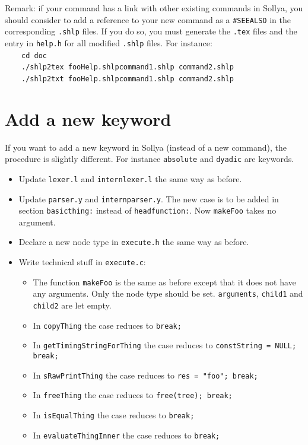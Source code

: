 \documentclass{article}
\newcommand{\commandName}{\texttt{foo}\xspace}
\newcommand{\commandMakeFunc}{\texttt{makeFoo}}
\newcommand{\commandShlpWithoutDoc}{\texttt{fooHelp.shlp}\xspace} %
\begin{document}
Remark: if your command has a link with other existing commands in Sollya, you should consider to add a reference to your new command as a \texttt{\#SEEALSO} in the corresponding \texttt{.shlp} files. If you do so, you must generate the \texttt{.tex} files and the entry in \texttt{help.h} for all modified \texttt{.shlp} files. For instance:\\
\phantom{1}~~~~\texttt{cd doc}\\
\phantom{1}~~~~\texttt{./shlp2tex }\commandShlpWithoutDoc \texttt{command1.shlp command2.shlp}\\
\phantom{1}~~~~\texttt{./shlp2txt }\commandShlpWithoutDoc \texttt{command1.shlp command2.shlp}


\section{Add a new keyword}
If you want to add a new keyword in Sollya (instead of a new command), the procedure is slightly different. For instance \texttt{absolute} and \texttt{dyadic} are keywords.

\begin{itemize}
\item Update \texttt{lexer.l} and \texttt{internlexer.l} the same way as before.
\item Update \texttt{parser.y} and \texttt{internparser.y}. The new case is to be added in section \texttt{basicthing:} instead of \texttt{headfunction:}. Now \commandMakeFunc{} takes no argument.
\item Declare a new node type in \texttt{execute.h} the same way as before.
\item Write technical stuff in \texttt{execute.c}:
  \begin{itemize}
  \item The function \commandMakeFunc{} is the same as before except that it does not have any arguments. Only the node type should be set. \texttt{arguments}, \texttt{child1} and \texttt{child2} are let empty.
  \item In \texttt{copyThing} the case reduces to \texttt{break;}
  \item In \texttt{getTimingStringForThing} the case reduces to \texttt{constString = NULL; break;}
  \item In \texttt{sRawPrintThing} the case reduces to \texttt{res = "}\commandName\texttt{"; break;}
  \item In \texttt{freeThing} the case reduces to \texttt{free(tree); break;}
  \item In \texttt{isEqualThing} the case reduces to \texttt{break;}
  \item In \texttt{evaluateThingInner} the case reduces to \texttt{break;}
  \end{itemize}
\end{itemize}
\end{document}
